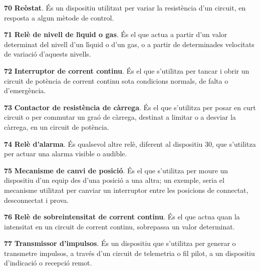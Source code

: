 \begin{multicols}{2}
\begin{list}{}
\item[\textbf{70}]  \textbf{Re\`{o}stat}. \'{E}s un dispositiu utilitzat per
variar la resist\`{e}ncia d'un circuit, en resposta a algun m\`{e}tode de control.

\item[\textbf{71}]  \textbf{Rel\`{e} de nivell de l\'{\i}quid
o gas}. \'{E}s el que actua a partir d'un valor determinat del nivell
d'un l\'{\i}quid o d'un gas, o a partir de determinades velocitats de
variaci\'{o} d'aquests nivells.

\item[\textbf{72}]  \textbf{Interruptor de corrent
continu}. \'{E}s el que s'utilitza per tancar i obrir un circuit de pot\`{e}ncia de corrent continu
 sota condicions normals, de falta o d'emerg\`{e}ncia.

\item[\textbf{73}]  \textbf{Contactor de resist\`{e}ncia
 de c\`{a}rrega}. \'{E}s el que s'utilitza per posar en curt circuit o per commutar un gra\'{o} de c\`{a}rrega,
 destinat a limitar o a desviar la c\`{a}rrega, en un circuit de pot\`{e}ncia.

\item[\textbf{74}]  \textbf{Rel\`{e} d'alarma}. \'{E}s qualsevol altre rel\`{e},
diferent al dispositiu 30, que s'utilitza per actuar una alarma
visible o audible.

\item[\textbf{75}]  \textbf{Mecanisme de canvi
de posici\'{o}}. \'{E}s el que s'utilitza per moure un dispositiu d'un equip
des d'una posici\'{o} a una altra; un  exemple, seria el mecanisme
utilitzat per canviar un interruptor entre les posicions de
connectat, desconnectat i prova.

\item[\textbf{76}]  \textbf{Rel\`{e} de
sobreintensitat de corrent continu}. \'{E}s el que actua quan la intensitat en un circuit de
corrent continu, sobrepassa un valor determinat.

\item[\textbf{77}]  \textbf{Transmissor d'impulsos}. \'{E}s un
 dispositiu que s'utilitza per generar o transmetre  impulsos, a trav\'{e}s d'un circuit de
telemetria o fil pilot, a un dispositiu d'indicaci\'{o} o recepci\'{o}
remot.


\end{list}
\end{multicols}

